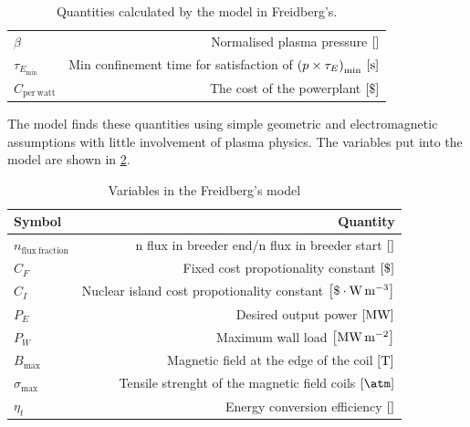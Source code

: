 \begin{table}
\begin{tabular}{lr}
		\(\beta\)                 & Normalised plasma pressure \(\bqty{\si{}}\)                                                            \\
		\(\tau_{E_\mathrm{min}}\) & Min confinement time for satisfaction of \(\pqty{p\times\tau_E}_\mathrm{min}\) \(\bqty{\si{\second}}\) \\
		\(C_\mathrm{per \ watt}\) & The cost of the powerplant \(\bqty{\$}\)                                                               \\
		\bottomrule
	\end{tabular}
	\caption{Quantities calculated by the model in Freidberg's\cite{freidberg_plasma_2007}.}
	\label{QFR}
\end{table}
The model finds these quantities using simple geometric and electromagnetic assumptions with little involvement of plasma physics. The variables put into the model are shown in \cref{VFR}.
\begin{table}
	\begin{tabular}{lr}
		\toprule
		Symbol                         & Quantity                                                                                 \\
		\midrule
		\(n_\mathrm{flux \ fraction}\) & n flux in breeder end/n flux in breeder start \(\bqty{}\)                                \\
		\(C_F\)                        & Fixed cost propotionality constant \(\bqty{\$}\)                                         \\
		\(C_I\)                        & Nuclear island cost propotionality constant \(\bqty{\$\cdot\si{\watt\per\meter\cubed}}\) \\
		\(P_E\)                        & Desired output power \(\bqty{\si{\mega\watt}}\)                                          \\
		\(P_W\)                        & Maximum wall load \(\bqty{\si{\mega\watt\per\meter\squared}}\)                           \\
		\(B_{\max}\)                   & Magnetic field at the edge of the coil \(\bqty{\si{\tesla}}\)                            \\
		\(\sigma_{\max}\)              & Tensile strenght of the magnetic field coils \(\bqty{\si{\atm}}\)                        \\
		\(\eta_t\)                     & Energy conversion efficiency \(\bqty{}\)                                                 \\
		\bottomrule
	\end{tabular}
	\caption{Variables in the Freidberg's model}
	\label{VFR}
\end{table}
